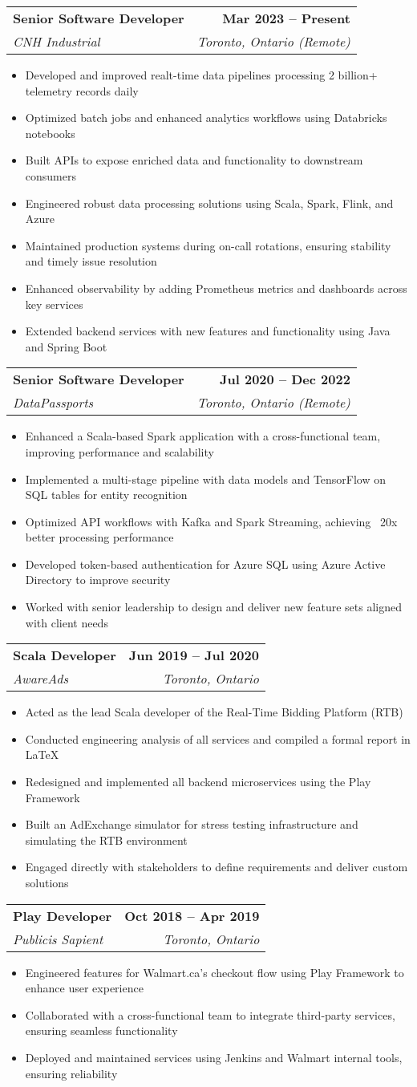 \documentclass[letterpaper,11pt]{article}
\makeatletter
\newcommand{\resumeItem}[1]{
  \item\small{
    {#1 \vspace{-1pt}}
  }
}
\newcommand{\resumeSubheading}[4]{
  \vspace{-3pt}\item
    \begin{tabular*}{0.97\textwidth}[t]{l@{\extracolsep{\fill}}r}
      \textbf{#1} & {\small \textbf{#2}} \\
      \textit{\fontsize{10}{11}\selectfont #3} & \textit{\fontsize{8}{10}\selectfont \textcolor{awesome-skyblue}{#4}} \\  %
    \end{tabular*}\vspace{-1pt}
}
\newcommand{\resumeItemListStart}{\begin{itemize}}
\newcommand{\resumeItemListEnd}{\end{itemize}\vspace{2pt}}
\makeatother
\begin{document}
    \resumeSubheading
      {Senior Software Developer}{Mar 2023 -- Present}
      {CNH Industrial}{Toronto, Ontario (Remote)}
      \resumeItemListStart
\resumeItem{Developed and improved realt-time data pipelines processing 2 billion+ telemetry records daily}
\resumeItem{Optimized batch jobs and enhanced analytics workflows using Databricks notebooks}
\resumeItem{Built APIs to expose enriched data and functionality to downstream consumers}
\resumeItem{Engineered robust data processing solutions using Scala, Spark, Flink, and Azure}
\resumeItem{Maintained production systems during on-call rotations, ensuring stability and timely issue resolution}
\resumeItem{Enhanced observability by adding Prometheus metrics and dashboards across key services}
\resumeItem{Extended backend services with new features and functionality using Java and Spring Boot}
      \resumeItemListEnd
      
\resumeSubheading
  {Senior Software Developer}{Jul 2020 -- Dec 2022}
  {DataPassports}{Toronto, Ontario (Remote)}
  \resumeItemListStart
    \resumeItem{Enhanced a Scala-based Spark application with a cross-functional team, improving performance and scalability}
    \resumeItem{Implemented a multi-stage pipeline with data models and TensorFlow on SQL tables for entity recognition}
    \resumeItem{Optimized API workflows with Kafka and Spark Streaming, achieving ~20x better processing performance}
    \resumeItem{Developed token-based authentication for Azure SQL using Azure Active Directory to improve security}
    \resumeItem{Worked with senior leadership to design and deliver new feature sets aligned with client needs}
  \resumeItemListEnd

\resumeSubheading
  {Scala Developer}{Jun 2019 -- Jul 2020}
  {AwareAds}{Toronto, Ontario}
  \resumeItemListStart
    \resumeItem{Acted as the lead Scala developer of the Real-Time Bidding Platform (RTB)}
    \resumeItem{Conducted engineering analysis of all services and compiled a formal report in \LaTeX}
    \resumeItem{Redesigned and implemented all backend microservices using the Play Framework}
    \resumeItem{Built an AdExchange simulator for stress testing infrastructure and simulating the RTB environment}
    \resumeItem{Engaged directly with stakeholders to define requirements and deliver custom solutions}
  \resumeItemListEnd

\resumeSubheading
  {Play Developer}{Oct 2018 -- Apr 2019}
  {Publicis Sapient}{Toronto, Ontario}
  \resumeItemListStart
    \resumeItem{Engineered features for Walmart.ca’s checkout flow using Play Framework to enhance user experience}
    \resumeItem{Collaborated with a cross-functional team to integrate third-party services, ensuring seamless functionality}
    \resumeItem{Deployed and maintained services using Jenkins and Walmart internal tools, ensuring reliability}
  \resumeItemListEnd
\end{document}
